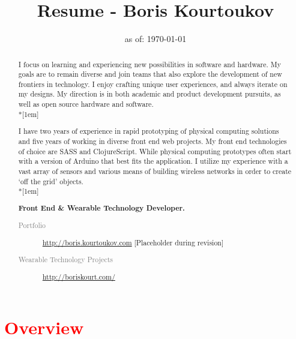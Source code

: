 
\title{Resume - Boris Kourtoukov}
\date{as of: \today}

\maketitle

\section{\textcolor{red}{Overview}}

\begin{abstract}
	I focus on learning and experiencing new possibilities in software and hardware. My goals are to remain diverse and join teams that also explore the development of new frontiers in technology. I enjoy crafting unique user experiences, and always iterate on my designs.  My direction is in both academic and product development pursuits, as well as open source hardware and software. \\*[1em]

	I have two years of experience in rapid prototyping of physical computing solutions and five years of working in diverse front end web projects. My front end technologies of choice are SASS and ClojureScript. While physical computing prototypes often start with a version of Arduino that best fits the application. I utilize my experience with a vast array of sensors and various means of building wireless networks in order to create `off the grid' objects. \\*[1em]

\noindent
\textbf{Front End \& Wearable Technology Developer. }
\begin{description}
	\item[\textcolor{gray}{Portfolio}] \url{http://boris.kourtoukov.com} [Placeholder during revision] 
	\item[\textcolor{gray}{Wearable Technology Projects}] \url{http://boriskourt.com/} 
\end{description}
\end{abstract}



